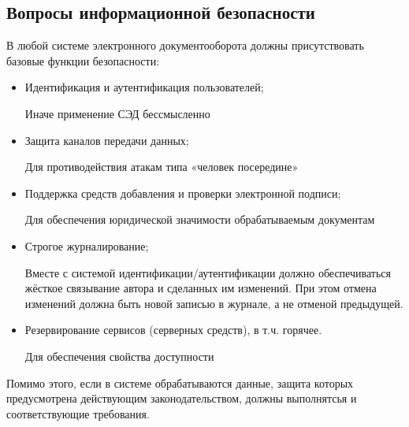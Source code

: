 \subsection{Вопросы информационной безопасности} \label{review_security}

В любой системе электронного документооборота должны присутствовать базовые функции безопасности:
\begin{itemize}
	\item Идентификация и аутентификация пользователей;

	Иначе применение СЭД бессмысленно
	\item Защита каналов передачи данных;

	Для противодействия атакам типа «человек посередине»
	\item Поддержка средств добавления и проверки электронной подписи;

	Для обеспечения юридической значимости обрабатываемым документам
	\item Строгое журналирование;

	Вместе с системой идентификации/аутентификации должно обеспечиваться жёсткое связывание автора и сделанных им изменений. При этом отмена изменений должна быть новой записью в журнале, а не отменой предыдущей.
	\item Резервирование сервисов (серверных средств), в т.ч. горячее.

	Для обеспечения свойства доступности
\end{itemize}

Помимо этого, если в системе обрабатываются данные, защита которых предусмотрена действующим законодательством, должны выполнятсья и соответствующие требования.